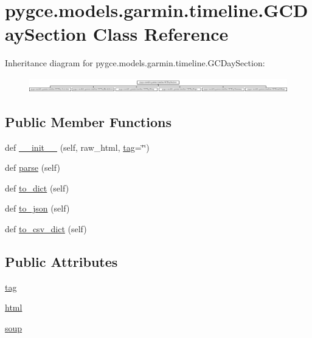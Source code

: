 \hypertarget{classpygce_1_1models_1_1garmin_1_1timeline_1_1_g_c_day_section}{}\section{pygce.\+models.\+garmin.\+timeline.\+G\+C\+Day\+Section Class Reference}
\label{classpygce_1_1models_1_1garmin_1_1timeline_1_1_g_c_day_section}
Inheritance diagram for pygce.\+models.\+garmin.\+timeline.\+G\+C\+Day\+Section\+:\begin{figure}[H]
\begin{center}
\leavevmode
\includegraphics[height=0.634921cm]{classpygce_1_1models_1_1garmin_1_1timeline_1_1_g_c_day_section}
\end{center}
\end{figure}
\subsection*{Public Member Functions}
\begin{DoxyCompactItemize}
\item 
def \hyperlink{classpygce_1_1models_1_1garmin_1_1timeline_1_1_g_c_day_section_aae8c8c4a74381fa4ee47881ad498fb8f}{\+\_\+\+\_\+init\+\_\+\+\_\+} (self, raw\+\_\+html, \hyperlink{classpygce_1_1models_1_1garmin_1_1timeline_1_1_g_c_day_section_a3dacbeacfedec2f69dcbb9fe6870f8a3}{tag}=\char`\"{}\char`\"{})
\item 
def \hyperlink{classpygce_1_1models_1_1garmin_1_1timeline_1_1_g_c_day_section_ac1ddb2f5379e356e93166d1ea934b9c9}{parse} (self)
\item 
def \hyperlink{classpygce_1_1models_1_1garmin_1_1timeline_1_1_g_c_day_section_adf3f25be05c84b2fc99d22cb5014e68d}{to\+\_\+dict} (self)
\item 
def \hyperlink{classpygce_1_1models_1_1garmin_1_1timeline_1_1_g_c_day_section_a810c65491986e687542ee5a4f02c51d7}{to\+\_\+json} (self)
\item 
def \hyperlink{classpygce_1_1models_1_1garmin_1_1timeline_1_1_g_c_day_section_a3a8d885a0155c9fa13843609fb7bf80d}{to\+\_\+csv\+\_\+dict} (self)
\end{DoxyCompactItemize}
\subsection*{Public Attributes}
\begin{DoxyCompactItemize}
\item 
\hyperlink{classpygce_1_1models_1_1garmin_1_1timeline_1_1_g_c_day_section_a3dacbeacfedec2f69dcbb9fe6870f8a3}{tag}
\item 
\hyperlink{classpygce_1_1models_1_1garmin_1_1timeline_1_1_g_c_day_section_ac70b12b38ec07c1afbd3198a2620fe86}{html}
\item 
\hyperlink{classpygce_1_1models_1_1garmin_1_1timeline_1_1_g_c_day_section_ae04dcff466d78ae686dce462057260a9}{soup}
\end{DoxyCompactItemize}


